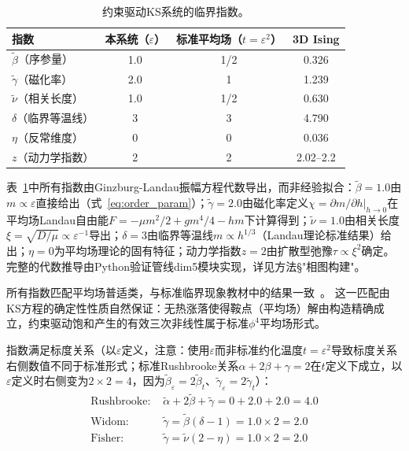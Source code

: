 \documentclass[sn-nature,pdflatex]{sn-jnl}
\begin{document}
\begin{table}[htbp]
\centering
\caption{约束驱动KS系统的临界指数。}
\label{tab:critical_exponents}
\begin{tabular}{lccc}
\toprule
指数 & 本系统（$\varepsilon$） & 标准平均场（$t=\varepsilon^2$） & 3D Ising \\
\midrule
$\tilde{\beta}$（序参量）   & 1.0   & 1/2   & 0.326 \\
$\tilde{\gamma}$（磁化率）   & 2.0   & 1     & 1.239 \\
$\tilde{\nu}$（相关长度）    & 1.0   & 1/2   & 0.630 \\
$\delta$（临界等温线）       & 3     & 3     & 4.790 \\
$\eta$（反常维度）           & 0     & 0     & 0.036 \\
$z$（动力学指数）           & 2     & 2     & 2.02--2.2 \\
\bottomrule
\end{tabular}
\end{table}

表~\ref{tab:critical_exponents}中所有指数由Ginzburg-Landau振幅方程代数导出，而非经验拟合：$\tilde{\beta}=1.0$由$m \propto \varepsilon$直接给出（式~\ref{eq:order_param}）；$\tilde{\gamma}=2.0$由磁化率定义$\chi = \partial m/\partial h|_{h\to 0}$在平均场Landau自由能$F = -\mu m^2/2 + g m^4/4 - hm$下计算得到；$\tilde{\nu}=1.0$由相关长度$\xi = \sqrt{D/\mu} \propto \varepsilon^{-1}$导出；$\delta=3$由临界等温线$m \propto h^{1/3}$（Landau理论标准结果）给出；$\eta=0$为平均场理论的固有特征；动力学指数$z=2$由扩散型弛豫$\tau \propto \xi^2$确定。完整的代数推导由Python验证管线dim5模块实现，详见方法§"相图构建"。

所有指数匹配平均场普适类，与标准临界现象教材中的结果一致~\cite{chaikin_lubensky_1995,stanley_1971,goldenfeld_1992}。
这一匹配由KS方程的确定性性质自然保证：无热涨落使得鞍点（平均场）解由构造精确成立，约束驱动饱和产生的有效三次非线性属于标准$\phi^4$平均场形式。

指数满足标度关系（以$\varepsilon$定义，注意：使用$\varepsilon$而非标准约化温度$t = \varepsilon^2$导致标度关系右侧数值不同于标准形式；标准Rushbrooke关系$\alpha + 2\beta + \gamma = 2$在$t$定义下成立，以$\varepsilon$定义时右侧变为$2 \times 2 = 4$，因为$\tilde{\beta}_\varepsilon = 2\tilde{\beta}_t$、$\tilde{\gamma}_\varepsilon = 2\tilde{\gamma}_t$）：
\begin{align}
\text{Rushbrooke: } &\tilde{\alpha} + 2\tilde{\beta} + \tilde{\gamma} = 0 + 2.0 + 2.0 = 4.0 \\
\text{Widom: } &\tilde{\gamma} = \tilde{\beta}(\delta - 1) = 1.0 \times 2 = 2.0 \\
\text{Fisher: } &\tilde{\gamma} = \tilde{\nu}(2 - \eta) = 1.0 \times 2 = 2.0
\end{align}
\end{document}
